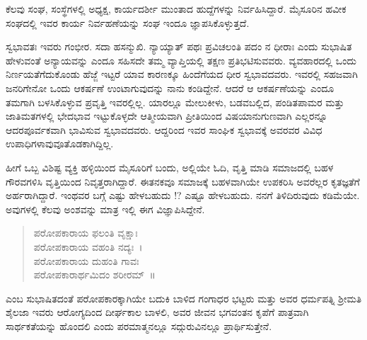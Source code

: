 {ಕೆಲವು ಸಂಘ, ಸಂಸ್ಥೆಗಳಲ್ಲಿ ಅಧ್ಯಕ್ಷ, ಕಾರ್ಯದರ್ಶೀ ಮುಂತಾದ ಹುದ್ದೆಗಳನ್ನು ನಿರ್ವಹಿಸಿದ್ದಾರೆ. ಮೈಸೂರಿನ ಹವೀಕ ಸಂಘದಲ್ಲಿ ಇವರ ಕಾರ್ಯ ನಿರ್ವಹಣೆಯನ್ನು ಸಂಘ ಇಂದೂ ಜ್ಞಾಪಸಿಕೊಳ್ಳುತ್ತದೆ. 
\vskip 3pt

ಸ್ವಭಾವತಃ ಇವರು ಗಂಭೀರ. ಸದಾ ಹಸನ್ಮುಖಿ. ನ್ಯಾಯ್ಯಾತ್ ಪಥಃ ಪ್ರವಿಚಲಂತಿ ಪದಂ ನ ಧೀರಾಃ ಎಂದು ಸುಭಾಷಿತ ಹೇಳುವಂತೆ ಅನ್ಯಾಯವನ್ನು ಎಂದೂ ಸಹಿಸದೇ ತಮ್ಮ ವ್ಯಾಪ್ತಿಯಲ್ಲಿ ತಕ್ಷಣ ಪ್ರತಿಭಟಿಸುವವರು. ವ್ಯವಹಾರದಲ್ಲಿ ಒಂದು  ನಿರ್ಣಯ\break  ತೆಗೆದುಕೊಂಡು ಹೆಜ್ಜೆ  ಇಟ್ಟರೆ ಯಾವ ಕಾರಣಕ್ಕೂ ಹಿಂದೆಗೆಯದ ಧೀರ ಸ್ವಭಾವದವರು. ಇವರಲ್ಲಿ ಸಹಜವಾಗಿ ಜನರಿಗೇನೋ ಒಂದು ಆಕರ್ಷಣೆ ಉಂಟಾಗುವುದನ್ನು ನಾನು ಕಂಡಿದ್ದೇನೆ. ಆದರೆ ಆ ಆಕರ್ಷಣೆಯನ್ನು ಎಂದೂ ತಮಗಾಗಿ ಬಳಸಿಕೊಳ್ಳುವ ಪ್ರವೃತ್ತಿ ಇವರಲ್ಲಿಲ್ಲ.  ಯಾರಲ್ಲೂ ಮೇಲು\enginline{-}ಕೀಳು, ಬಡವ\enginline{-}ಬಲ್ಲಿದ, ಪಂಡಿತ\enginline{-}ಪಾಮರ ಮತ್ತು ಜಾತಿ\enginline{-}ಮತಗಳಲ್ಲಿ ಭೇದಭಾವ ಇಟ್ಟುಕೊಳ್ಳದೇ ಆತ್ಮೀಯವಾಗಿ ಪ್ರೀತಿಯಿಂದ ವಿಷಯಾನು\-ಗುಣವಾಗಿ ಎಲ್ಲರನ್ನೂ ಆದರಪೂರ್ವಕವಾಗಿ ಭಾವಿಸುವ ಸ್ವಭಾವದವರು. ಆದ್ದರಿಂದ ಇವರ ಸಾಂಘಿಕ ಸ್ವಭಾವಕ್ಕೆ ಅವರವರ ವಿವಿಧ ಉಪಾಧಿಗಳಾವುವೂ\break ತೊಡಕಾಗಿದ್ದಿಲ್ಲ.
\vskip 3pt

ಹೀಗೆ ಒಬ್ಬ ವಿಶಿಷ್ಟ ವ್ಯಕ್ತಿ ಹಳ್ಳಿಯಿಂದ ಮೈಸೂರಿಗೆ ಬಂದು, ಅಲ್ಲಿಯೇ ಓದಿ, ವೃತ್ತಿ ಮಾಡಿ ಸಮಾಜದಲ್ಲಿ ಬಹಳ ಗೌರವಗಳಿಸಿ ವೃತ್ತಿಯಿಂದ ನಿವೃತ್ತರಾಗಿದ್ದಾರೆ. \hbox{ಈತನಕವೂ} ಸಮಾಜಕ್ಕೆ ಬಹಳವಾಗಿಯೇ ಉಪಕರಿಸಿ ಅವರೆಲ್ಲರ ಕೃತಜ್ಞತೆಗೆ ಅರ್ಹರಾಗಿದ್ದಾರೆ. \hbox{ಇಂಥವರ} ಬಗ್ಗೆ ಎಷ್ಟು ಹೇಳಬಹುದು !? ಎಷ್ಟೂ ಹೇಳಬಹುದು. ನನಗೆ \hbox{ತಿಳಿದಿರುವುದು} \hbox{ಕಡಿಮೆಯೇ.} ಅವುಗಳಲ್ಲಿ ಕೆಲವು ಅಂಶವನ್ನು ಮಾತ್ರ ಇಲ್ಲಿ ಈಗ ವಿಜ್ಞಾಪಿಸಿದ್ದೇನೆ. 
\begin{verse}
ಪರೋಪಕಾರಾಯ ಫಲಂತಿ ವೃಕ್ಷಾಃ \\  ಪರೋಪಕಾರಾಯ ವಹಂತಿ ನದ್ಯಃ~।\\
ಪರೋಪಕಾರಾಯ ದುಹಂತಿ ಗಾವಃ \\ ಪರೋಪಕಾರಾರ್ಥಮಿದಂ ಶರೀರಮ್~॥
\end{verse}
ಎಂಬ ಸುಭಾಷಿತದಂತೆ ಪರೋಪಕಾರಕ್ಕಾಗಿಯೇ  ಬದುಕಿ ಬಾಳಿದ ಗಂಗಾಧರ ಭಟ್ಟರು ಮತ್ತು ಅವರ ಧರ್ಮಪತ್ನಿ ಶ್ರೀಮತಿ ಶೈಲಜಾ ಇವರು ಆರೋಗ್ಯದಿಂದ ದೀರ್ಘಕಾಲ ಬಾಳಲಿ, ಅವರ ಜೀವನ ಭಗವಂತನ ಕೃಪೆಗೆ ಪಾತ್ರವಾಗಿ ಸಾರ್ಥಕತೆಯನ್ನು ಹೊಂದಲಿ ಎಂದು ಪರಮಾತ್ಮನಲ್ಲೂ ಸದ್ಗುರುವಿನಲ್ಲೂ ಪ್ರಾರ್ಥಿಸುತ್ತೇನೆ.

\articleend
}
